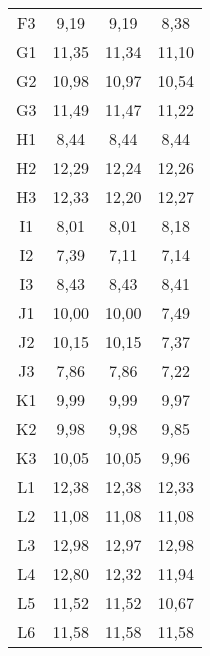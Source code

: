 \begin{center}
\begin{longtable}{cccc}
    F3    & 9,19  & 9,19  & 8,38 \\
    G1    & 11,35 & 11,34 & 11,10 \\
    G2    & 10,98 & 10,97 & 10,54 \\
    G3    & 11,49 & 11,47 & 11,22 \\
    H1    & 8,44  & 8,44  & 8,44 \\
    H2    & 12,29 & 12,24 & 12,26 \\
    H3    & 12,33 & 12,20 & 12,27 \\
    I1    & 8,01  & 8,01  & 8,18 \\
    I2    & 7,39  & 7,11  & 7,14 \\
    I3    & 8,43  & 8,43  & 8,41 \\
    J1    & 10,00 & 10,00 & 7,49 \\
    J2    & 10,15 & 10,15 & 7,37 \\
    J3    & 7,86  & 7,86  & 7,22 \\
    K1    & 9,99  & 9,99  & 9,97 \\
    K2    & 9,98  & 9,98  & 9,85 \\
    K3    & 10,05 & 10,05 & 9,96 \\
    L1    & 12,38 & 12,38 & 12,33 \\
    L2    & 11,08 & 11,08 & 11,08 \\
    L3    & 12,98 & 12,97 & 12,98 \\
    L4    & 12,80 & 12,32 & 11,94 \\
    L5    & 11,52 & 11,52 & 10,67 \\
    L6    & 11,58 & 11,58 & 11,58 \\


\end{longtable}
\end{center}

